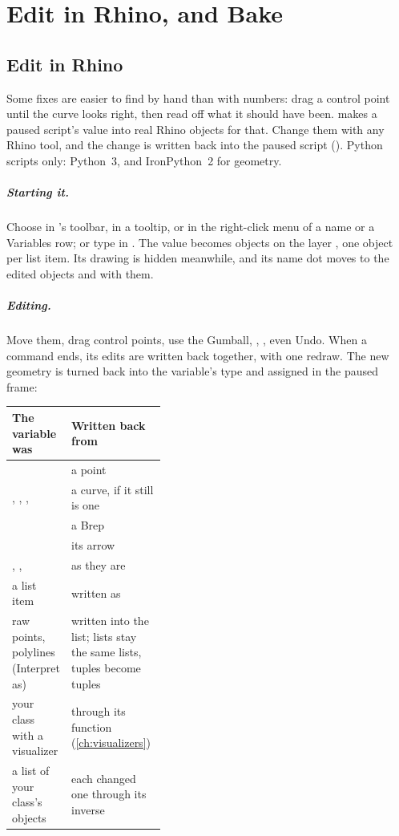 \chapter{Edit in Rhino, and Bake}\label{ch:edit}

\section{Edit in Rhino}\label{sec:editinrhino}

Some fixes are easier to find by hand than with numbers: drag a control point until the curve looks
right, then read off what it should have been.  makes a paused script's value into
real Rhino objects for that. Change them with any Rhino tool, and the change is written back into the
paused script (). Python scripts only: Python~3, and IronPython~2 for geometry.

\paragraph{Starting it.} Choose  in 's toolbar, in a tooltip, or in the
right-click menu of a name or a Variables row; or type  in . The value
becomes objects on the layer , one object per list item. Its drawing is
hidden meanwhile, and its name dot moves to the edited objects and with them.

\paragraph{Editing.} Move them, drag control points, use the Gumball, , , even
Undo. When a command ends, its edits are written back together, with one redraw. The new geometry is
turned back into the variable's type and assigned in the paused frame:

\begin{xltabular}{\linewidth}{@{}P{0.38\linewidth}L@{}}
\toprule
\textsf{\textbf{The variable was}} & \textsf{\textbf{Written back from}} \\ \midrule
{}                 & a point \\
, , ,  & a curve, if it still is one \\
                     & a Brep \\
                & its arrow \\
, ,  & as they are \\
a list item                    & written as  \\
raw points, polylines (Interpret as) & written into the list; lists stay the same lists, tuples become tuples \\
your class with a visualizer   & through its  function (\cref{ch:visualizers}) \\
a list of your class's objects & each changed one through its inverse \\
\bottomrule
\end{xltabular}

